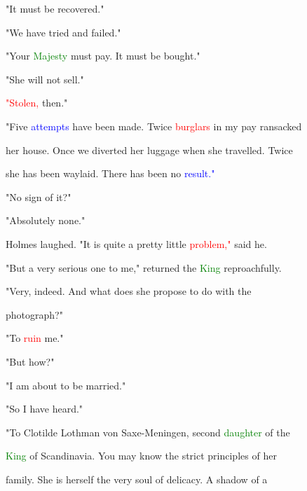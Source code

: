  "It must be recovered."



 "We have tried and failed."



 "Your \textcolor{green}{Majesty} must \textcolor{BurntOrange}{pay.} It must be bought."



 "She will not sell."



 \textcolor{red}{"Stolen,} then."



 "Five \textcolor{blue}{attempts} have been made. Twice \textcolor{red}{burglars} in my \textcolor{BurntOrange}{pay} ransacked

 her house. Once we diverted her luggage when she travelled. Twice

 she has been waylaid. There has been no \textcolor{blue}{result."}



 "No sign of it?"



 "Absolutely none."



 Holmes \textcolor{BurntOrange}{laughed.} "It is quite a \textcolor{BurntOrange}{pretty} little \textcolor{red}{problem,"} said he.



 "But a very serious one to me," returned the \textcolor{green}{King} reproachfully.



 "Very, indeed. And what does she propose to do with the

 photograph?"



 "To \textcolor{red}{ruin} me."



 "But how?"



 "I am about to be married."



 "So I have heard."



 "To Clotilde Lothman von Saxe-Meningen, second \textcolor{green}{daughter} of the

 \textcolor{green}{King} of Scandinavia. You may know the strict principles of her

 family. She is herself the very soul of delicacy. A shadow of a

